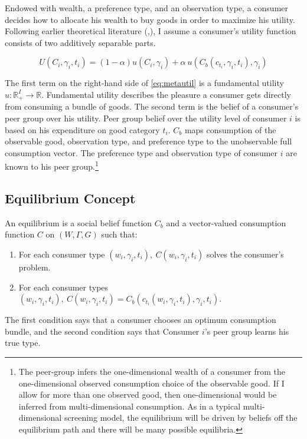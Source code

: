 Endowed with wealth, a preference type, and an observation type, a consumer decides how to allocate his wealth to buy goods in order to maximize his utility.  Following earlier theoretical literature (\citet{Heffetz2011},\citet{Ireland1994}), I assume a consumer's utility function consists of two additively separable parts.

\begin{equation}
    \label{eq:metautil}
    U(C_i,\gamma_i,t_i) = (1-\alpha) u(C_i,\gamma_i) + \alpha\  u(C_b(c_{t_i},\gamma_i,t_i),\gamma_i)
\end{equation}

The first term on the right-hand side of \eqref{eq:metautil} is a fundamental utility $u:\mathbb{R}_+^{I}\rightarrow\mathbb{R}$.  
Fundamental utility describes the pleasure a consumer gets directly from consuming a bundle of goods.
The second term is the belief of a consumer's peer group over his utility.  Peer group belief over the utility level of consumer $i$ is based on his expenditure on good category $t_i$.  $C_b$ maps consumption of the observable good, observation type, and preference type to the unobservable full consumption vector.  The preference type and observation type of consumer $i$ are known to his peer group.\footnote{The peer-group infers the one-dimensional wealth of a consumer from the one-dimensional observed consumption choice of the observable good.  If I allow for more than one observed good, then one-dimensional would be inferred from multi-dimensional consumption.  As in a typical multi-dimensional screening model, the equilibrium will be driven by beliefs off the equilibrium path and there will be many possible equilibria.}

\subsection{Equilibrium Concept}

An equilibrium is a social belief function $C_b$ and a vector-valued consumption function $C$ on $(W,\Gamma,G)$ such that:
\begin{enumerate}
	\item For each consumer type $(w_i,\gamma_i,t_i), \ C(w_i,\gamma_i,t_i)$ solves the consumer's problem.
    \item For each consumer types $(w_i,\gamma_i,t_i), \ C(w_i,\gamma_i,t_i) = C_b(c_{t_i}(w_i,\gamma_i,t_i),\gamma_i,t_i).$
\end{enumerate}
The first condition says that a consumer chooses an optimum consumption bundle, and the second condition says that Consumer $i$'s peer group learns his true type.

